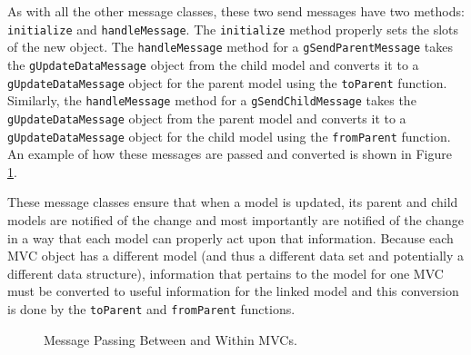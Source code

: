 \documentclass{article}[11pt]
\newcommand{\Rfunction}[1]{{\texttt{#1}}}
\newcommand{\Robject}[1]{{\texttt{#1}}}
\begin{document}
As with all the other message classes, these two send messages have two
methods: \Rfunction{initialize} and \Rfunction{handleMessage}.  The
\Rfunction{initialize} method properly sets the slots of the new object.  The
\Rfunction{handleMessage} method for a \Robject{gSendParentMessage}
takes the \Robject{gUpdateDataMessage} object from the child model and converts
it to a \Robject{gUpdateDataMessage} object for the parent model using the
\Rfunction{toParent} function.  Similarly, the \Rfunction{handleMessage}
method for a \Robject{gSendChildMessage} takes the
\Robject{gUpdateDataMessage} object from the parent model and converts it to a
\Robject{gUpdateDataMessage} object for the child model using the
\Rfunction{fromParent} function.  An example of how these messages are passed
and converted is shown in Figure \ref{Fig:MessPass}.

These message classes ensure that when a model is updated, its parent and
child models are notified of the change and most importantly are
notified of the change in a way that each model can properly act upon that
information.  Because each MVC object has a different model (and thus a
different data set and potentially a different data structure), information
that pertains to the model for one MVC must be converted to useful information
for the linked model and this conversion is done by the \Rfunction{toParent}
and \Rfunction{fromParent} functions.  

\begin{figure}[ht]
  \begin{center}
    \caption{ Message Passing Between and Within MVCs. }
    \label{Fig:MessPass}
  \end{center}
\end{figure}
\end{document}
